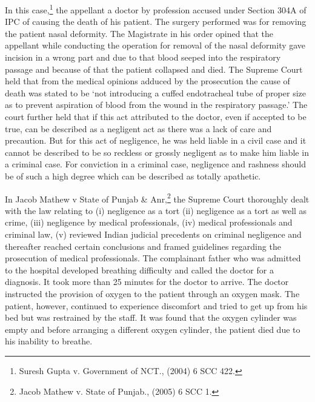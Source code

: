\begin{multicols}{2}
\vspace{-.2cm}


\vspace{-.1cm}

\noi
In this case,\footnote{Suresh Gupta v. Government of NCT., (2004) 6 SCC 422.} the appellant a doctor by profession accused under Section 304A of IPC of causing the death of his patient. The surgery performed was for removing the patient nasal deformity. The Magistrate in his order opined that the appellant while conducting the operation for removal of the nasal deformity gave incision in a wrong part and due to that blood seeped into the respiratory passage and because of that the patient collapsed and died. The Supreme Court held that from the
medical opinions adduced by the prosecution the cause of death was stated to be `not introducing
a cuffed endotracheal tube of proper size as to prevent aspiration of blood from the wound in the
respiratory passage.’ The court further held that if this act attributed to the doctor, even if accepted
to be true, can be described as a negligent act as there was a lack of care and precaution. But for
this act of negligence, he was held liable in a civil case and it cannot be described to be so reckless
or grossly negligent as to make him liable in a criminal case. For conviction in a criminal case,
negligence and rashness should be of such a high degree which can be described as totally
apathetic.

\vspace{-.15cm}


\vspace{-.1cm}

\noi
In Jacob Mathew v State of Punjab \& Anr,\footnote{ Jacob Mathew v. State of Punjab., (2005) 6 SCC 1.} the Supreme Court thoroughly dealt with the law relating to (i) negligence as a tort (ii) negligence as a tort as well as crime, (iii) negligence by
medical professionals, (iv) medical professionals and criminal law, (v) reviewed Indian judicial
precedents on criminal negligence and thereafter reached certain conclusions and framed
guidelines regarding the prosecution of medical professionals. The complainant father who was
admitted to the hospital developed breathing difficulty and called the doctor for a diagnosis. It
took more than 25 minutes for the doctor to arrive. The doctor instructed the provision of oxygen
to the patient through an oxygen mask. The patient, however, continued to experience discomfort
and tried to get up from his bed but was restrained by the staff. It was found that the oxygen
cylinder was empty and before arranging a different oxygen cylinder, the patient died due to his
inability to breathe.


\end{multicols}
